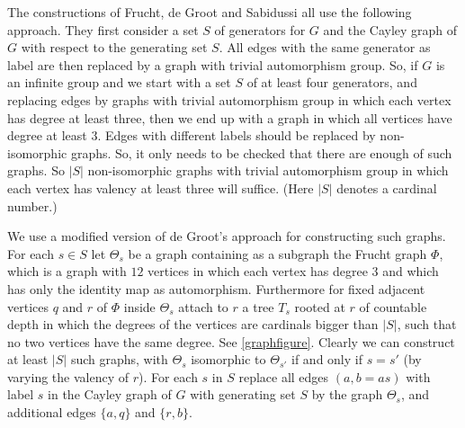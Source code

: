 \documentclass[oneside,a4paper]{amsart} %
\theoremstyle{definition}
\begin{document}
The constructions of Frucht, de Groot and Sabidussi all use the following approach. 
They first consider a set $S$ of generators for $G$ and the Cayley graph of $G$ with respect to the generating set $S$.
All edges with the same generator as label are then replaced by a graph with trivial automorphism group.
So, if $G$ is an infinite group and   we start with a set $S$ of at least four generators, 
and replacing edges by graphs with trivial automorphism group in which each vertex has degree at least three, then we end up
with a graph in which all vertices have degree at least $3$. Edges with different labels should be replaced by non-isomorphic graphs. 
So, it only needs to be checked that there are enough of such graphs. 
So $|S|$ non-isomorphic graphs with trivial automorphism group in which each vertex
has valency at least three will suffice. (Here $|S|$ denotes a cardinal number.)



We use a modified version of de Groot's approach \cite{groot} for constructing such graphs.
For each $s\in S$ let $\Theta_s$ be a graph containing as a subgraph the Frucht graph $\Phi$, which is a graph with $12$ vertices in which each vertex has degree $3$
and which has only the identity map as automorphism.
Furthermore for fixed adjacent vertices $q$ and $r$ of $\Phi$ inside $\Theta_s$ attach to $r$ a tree $T_s$ rooted at $r$ of countable depth in which the degrees of the vertices are cardinals bigger than $|S|$, 
such that no two vertices have the same degree. See \cref{graphfigure}. Clearly we can construct at least $|S|$ such graphs, with $\Theta_s$ isomorphic to $\Theta_{s'}$ if and only if $s=s'$ (by varying the valency of $r$). 
For each $s$ in $S$
replace all edges $(a,b=as)$ with label $s$ in the Cayley graph of $G$ with generating set $S$ by the graph $\Theta_s$, and additional edges $\{a,q\}$ and $\{r,b\}$.
\end{document}
